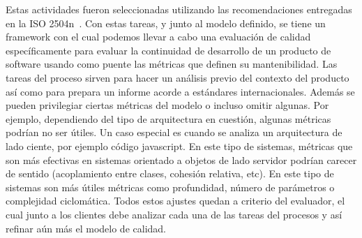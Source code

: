 Estas actividades fueron seleccionadas utilizando las recomendaciones entregadas en la ISO 2504n~\cite{25040}.
Con estas tareas, y junto al modelo definido, se tiene un framework con el cual podemos llevar a cabo
una evaluación de calidad específicamente para evaluar la continuidad de desarrollo de un producto de software
usando como puente las métricas que definen su mantenibilidad.
Las tareas del proceso sirven para hacer un análisis previo del contexto del producto así como para prepara un informe acorde a
estándares internacionales. Además se pueden privilegiar ciertas métricas del modelo o incluso omitir algunas. 
Por ejemplo, dependiendo del tipo de arquitectura en cuestión, algunas métricas podrían no ser útiles. Un caso especial es cuando se analiza un arquitectura de lado ciente, por
ejemplo código javascript. En este tipo de sistemas, métricas que son más efectivas en sistemas orientado a objetos de lado servidor podrían carecer
de sentido (acoplamiento entre clases, cohesión relativa, etc). En este tipo de sistemas son más útiles métricas como profundidad,
número de parámetros o complejidad ciclomática.
Todos estos ajustes quedan a criterio del evaluador, el cual junto a los clientes debe analizar cada una de las tareas del procesos y así
refinar aún más el modelo de calidad.
